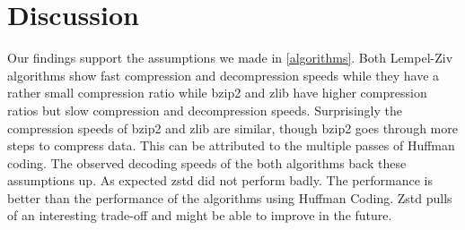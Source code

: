 \documentclass[
	12pt,
	a4paper,
	BCOR10mm,
	DIV14,
	listof=totoc,
	bibliography=totoc,
	headsepline
]{scrreprt}
\begin{document}
\FloatBarrier

\chapter{Discussion}
\label{Discussion}

Our findings support the assumptions we made in \ref{algorithms}.
Both Lempel-Ziv algorithms show fast compression and decompression speeds while they have a rather small compression ratio while bzip2 and zlib have higher compression ratios but slow compression and decompression speeds.
Surprisingly the compression speeds of bzip2 and zlib are similar, though bzip2 goes through more steps to compress data.
This can be attributed to the multiple passes of Huffman coding.
The observed decoding speeds of the both algorithms back these assumptions up.
As expected zstd did not perform badly.
The performance is better than the performance of the algorithms using Huffman Coding.
Zstd pulls of an interesting trade-off and might be able to improve in the future.
\end{document}
